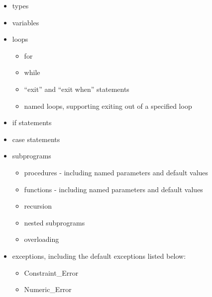 \documentclass[onecolumn,11pt]{article}
\begin{document}
\begin{itemize}
\item{types}

\item{variables}

\item{
  loops 
  \begin{itemize}
    \item{for}
    \item{while}
    \item{``exit'' and ``exit when'' statements}
    \item{named loops, supporting exiting out of a specified loop}
  \end{itemize}
}

\item{if statements}

\item{case statements}

\item{
  subprograms
  \begin{itemize}
    \item{procedures - including named parameters and default values}
    \item{functions - including named parameters and default values}
    \item{recursion}
    \item{nested subprograms}
    \item{overloading}
  \end{itemize}
}

\item{exceptions, including the default exceptions listed below:
  \begin{itemize}
    \item{Constraint\_Error}
    \item{Numeric\_Error}
  \end{itemize}
}

\end{itemize}
\end{document}
